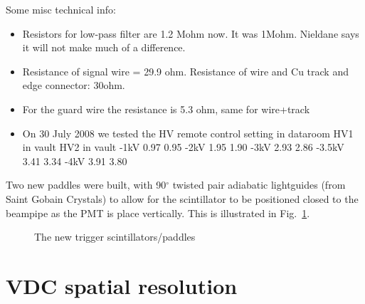 \documentclass[11pt]{report}
\begin{document}
Some misc technical info:
\begin{itemize}
\item Resistors for low-pass filter are 1.2 Mohm now. 
It was 1Mohm. Nieldane says it will not make much of a difference.
\item Resistance of signal wire = 29.9 ohm.
Resistance of wire and Cu track and edge connector: 30ohm.
\item For the guard wire the resistance is 5.3 ohm, same for wire+track
\item On 30 July 2008 we tested the HV remote control
setting in dataroom  HV1 in vault   HV2 in vault
-1kV                 0.97      0.95
-2kV                 1.95      1.90
-3kV                 2.93      2.86
-3.5kV               3.41      3.34
-4kV                 3.91      3.80
\end{itemize}

Two new paddles were built, with 90$^{\circ}$ twisted pair adiabatic lightguides (from Saint Gobain Crystals)
to allow for the scintillator to be positioned closed to the beampipe
as the PMT is place vertically. This is illustrated in Fig.~\ref{fig:newpaddles}.

\begin{figure}[htbp]
\begin{center}
\end{center}
\caption{\label{fig:newpaddles}
The new trigger scintillators/paddles}
\end{figure}





\section{VDC spatial resolution}\label{sec:posres}

\bigskip
\end{document}
